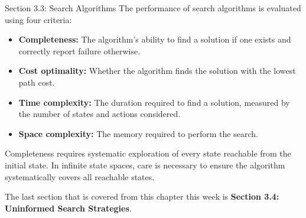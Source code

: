 \begin{notes}{Section 3.3: Search Algorithms}
    The performance of search algorithms is evaluated using four criteria:
    \begin{itemize}
        \item \textbf{Completeness:} The algorithm's ability to find a solution if one exists and correctly report failure otherwise.
        \item \textbf{Cost optimality:} Whether the algorithm finds the solution with the lowest path cost.
        \item \textbf{Time complexity:} The duration required to find a solution, measured by the number of states and actions considered.
        \item \textbf{Space complexity:} The memory required to perform the search.
    \end{itemize}

    Completeness requires systematic exploration of every state reachable from the initial state. In infinite state spaces, care is necessary to ensure the algorithm systematically covers all reachable states.
\end{notes}

The last section that is covered from this chapter this week is \textbf{Section 3.4: Uninformed Search Strategies}.

